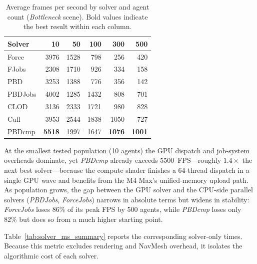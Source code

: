 \begin{table}[h]
\centering
\small
\begin{tabular}{lrrrrr}
\hline
\textbf{Solver} & \textbf{10} & \textbf{50} & \textbf{100} & \textbf{300} & \textbf{500} \\
\hline
Force         & 3976 & 1528 &  798 &  256 &  420 \\
FJobs         & 2308 & 1710 &  926 &  334 &  158 \\
PBD           & 3253 & 1388 &  776 &  356 &  142 \\
PBDJobs       & 4002 & 1285 & 1432 &  808 &  701 \\
CLOD          & 3136 & 2333 & 1721 &  980 &  828 \\
Cull          & 3953 & 2544 & 1838 & 1050 &  727 \\
PBDcmp        & \textbf{5518} & 1997 & 1647 & \textbf{1076} & \textbf{1001} \\
\hline
\end{tabular}
\caption{Average frames per second by solver and agent count
(\textit{Bottleneck} scene).  Bold values indicate the best result
within each column.}
\label{tab:fps_summary}
\end{table}

At the smallest tested population (10 agents) the GPU dispatch and
job-system overheads dominate, yet \textit{PBDcmp} already exceeds
5500~FPS---roughly $1.4\times$ the next best solver---because the
compute shader finishes a 64-thread dispatch in a single GPU wave and
benefits from the M4 Max's unified-memory upload path.  As population
grows, the gap between the GPU solver and the CPU-side parallel
solvers (\textit{PBDJobs}, \textit{ForceJobs}) narrows in absolute
terms but widens in stability: \textit{ForceJobs} loses 86\% of its
peak FPS by 500 agents, while \textit{PBDcmp} loses only 82\% but does
so from a much higher starting point.

Table~\ref{tab:solver_ms_summary} reports the corresponding
solver-only times.  Because this metric excludes rendering and NavMesh
overhead, it isolates the algorithmic cost of each solver.


